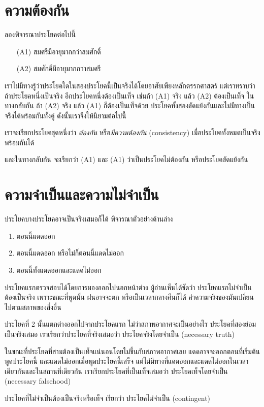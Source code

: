 \documentclass[a4paper,12pt]{extbook}
\theoremstyle{definition}
\theoremstyle{remark}
\newcommand{\boxthis}[1]{
	\begin{textbox}%
		#1 
	\end{textbox}%
}
\begin{document}
			\section{ความต้องกัน}
			ลองพิจารณาประโยคต่อไปนี้
			\begin{itemize}
				\item[(A1)]  สมศรีมีอายุมากกว่าสมศักดิ์
				\item[(A2)]  สมศักดิ์มีอายุมากกว่าสมศรี
			\end{itemize}
			เราไม่มีทางรู้ว่าประโยคใดในสองประโยคนี้เป็นจริงได้โดยอาศัยเพียงหลักตรรกศาสตร์ แต่เราทราบว่าถ้าประโยคหนึ่งเป็นจริง อีกประโยคหนึ่งต้องเป็นเท็จ เช่นถ้า (A1) จริง แล้ว (A2) ต้องเป็นเท็จ ในทางกลับกัน ถ้า (A2) จริง แล้ว (A1) ก็ต้องเป็นเท็จด้วย ประโยคทั้งสองขัดแย้งกันและไม่มีทางเป็นจริงได้พร้อมกันทั้งคู่ ดังนั้นเราจึงให้นิยามต่อไปนี้
			\boxthis{เราจะเรียกประโยคชุดหนึ่งว่า \textit{ต้องกัน} หรือ\textit{มีความต้องกัน} (consistency) เมื่อประโยคทั้งหมดเป็นจริงพร้อมกันได้}
			และในทางกลับกัน จะเรียกว่า (A1)  และ (A1) ว่าเป็นประโยคไม่ต้องกัน หรือประโยคขัดแย้งกัน
			
			\section{ความจำเป็นและความไม่จำเป็น}
				ประโยคบางประโยคอาจเป็นจริงเสมอก็ได้ พิจารณาตัวอย่างด้านล่าง
				\begin{enumerate}
					\item ตอนนี้แดดออก
					\item ตอนนี้แดดออก หรือไม่ก็ตอนนี้แดดไม่ออก
					\item ตอนนี้ทั้งแดดออกและแดดไม่ออก
				\end{enumerate}
				ประโยคแรกตรวจสอบได้โดยการมองออกไปนอกหน้าต่าง ผู้อ่านเห็นได้ชัดว่า ประโยคแรกไม่จำเป็นต้องเป็นจริง เพราะขณะที่พูดนั้น ฝนอาจจะตก หรือเป็นเวลากลางคืนก็ได้ ค่าความจริงของมันเปลี่ยนไปตามสภาพของสิ่งอื่น 
				
				ประโยคที่ 2 นั้นแตกต่างออกไปจากประโยคแรก ไม่ว่าสภาพอากาศจะเป็นอย่างไร ประโยคที่สองย่อมเป็นจริงเสมอ เราเรียกว่าประโยคที่จริงเสมอว่า ประโยคจริงโดยจำเป็น (necessary truth)
				
				ในขณะที่ประโยคที่สามต้องเป็นเท็จแน่นอนโดยไม่ขึ้นกับสภาพอากาศเลย แดดอาจจะออกตอนที่เริ่มต้นพูดประโยคนี้ และแดดไม่ออกเมื่อพูดประโยคนี้เสร็จ แต่ไม่มีทางที่แดดออกและแดดไม่ออกในเวลาเดียวกันและในสถานที่เดียวกัน เราเรียกประโยคที่เป็นเท็จเสมอว่า ประโยคเท็จโดยจำเป็น (necessary falsehood)
				
				ประโยคที่ไม่จำเป็นต้องเป็นจริงหรือเท็จ เรียกว่า ประโยคไม่จำเป็น (contingent)
\end{document}
